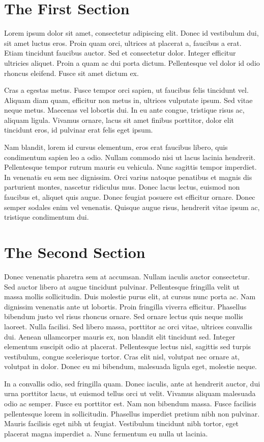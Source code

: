 \documentclass{article}
\begin{document}
\section{The First Section}

Lorem ipsum dolor sit amet, consectetur adipiscing elit. Donec id vestibulum
dui, sit amet luctus eros. Proin quam orci, ultrices at placerat a, faucibus a
erat. Etiam tincidunt faucibus auctor. Sed et consectetur dolor. Integer
efficitur ultricies aliquet. Proin a quam ac dui porta dictum. Pellentesque vel
dolor id odio rhoncus eleifend. Fusce sit amet dictum ex.

Cras a egestas metus. Fusce tempor orci sapien, ut faucibus felis tincidunt vel.
Aliquam diam quam, efficitur non metus in, ultrices vulputate ipsum. Sed vitae
neque metus. Maecenas vel lobortis dui. In eu ante congue, tristique risus ac,
aliquam ligula. Vivamus ornare, lacus sit amet finibus porttitor, dolor elit
tincidunt eros, id pulvinar erat felis eget ipsum.

Nam blandit, lorem id cursus elementum, eros erat faucibus libero, quis
condimentum sapien leo a odio. Nullam commodo nisi ut lacus lacinia hendrerit.
Pellentesque tempor rutrum mauris eu vehicula. Nunc sagittis tempor imperdiet.
In venenatis eu sem nec dignissim. Orci varius natoque penatibus et magnis dis
parturient montes, nascetur ridiculus mus. Donec lacus lectus, euismod non
faucibus et, aliquet quis augue. Donec feugiat posuere est efficitur ornare.
Donec semper sodales enim vel venenatis. Quisque augue risus, hendrerit vitae
ipsum ac, tristique condimentum dui.

\section{The Second Section}

Donec venenatis pharetra sem at accumsan. Nullam iaculis auctor consectetur.
Sed auctor libero at augue tincidunt pulvinar. Pellentesque fringilla velit ut
massa mollis sollicitudin. Duis molestie purus elit, at cursus nunc porta ac.
Nam dignissim venenatis ante ut lobortis. Proin fringilla viverra efficitur.
Phasellus bibendum justo vel risus rhoncus ornare. Sed ornare lectus quis neque
mollis laoreet. Nulla facilisi. Sed libero massa, porttitor ac orci vitae,
ultrices convallis dui. Aenean ullamcorper mauris ex, non blandit elit
tincidunt sed. Integer elementum suscipit odio at placerat. Pellentesque lectus
nisl, sagittis sed turpis vestibulum, congue scelerisque tortor. Cras elit
nisl, volutpat nec ornare at, volutpat in dolor. Donec eu mi bibendum,
malesuada ligula eget, molestie neque.

In a convallis odio, sed fringilla quam. Donec iaculis, ante at hendrerit
auctor, dui urna porttitor lacus, ut euismod tellus orci ut velit. Vivamus
aliquam malesuada odio ac semper. Fusce eu porttitor est. Nam non bibendum
massa. Fusce facilisis pellentesque lorem in sollicitudin. Phasellus imperdiet
pretium nibh non pulvinar. Mauris facilisis eget nibh ut feugiat. Vestibulum
tincidunt nibh tortor, eget placerat magna imperdiet a. Nunc fermentum eu nulla
ut lacinia.
\end{document}
